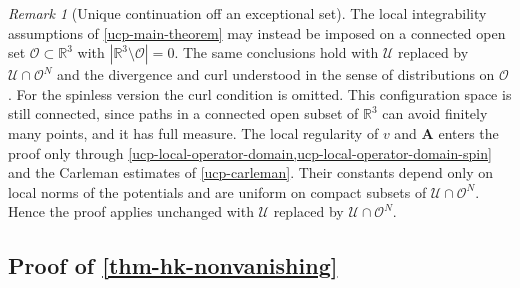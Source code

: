 \documentclass[final,reqno]{amsart}
\theoremstyle{remark}
\newtheorem{remark}{Remark}
\newcommand{\RR}{\mathbb{R}}
\newcommand{\vA}{{\mathbf{A}}}
\begin{document}
\begin{remark}[Unique continuation off an exceptional set]
\label{rem-ucp-domain-extension}
The local integrability assumptions of \cref{ucp-main-theorem} may
instead be imposed on a connected open set $\mathcal O\subset\RR^3$
with $|\RR^3\setminus\mathcal O|=0$.  The same conclusions hold with
$\mathcal U$ replaced by $\mathcal U\cap\mathcal O^N$ and the
divergence and curl understood in the sense of distributions on $\mathcal O$.
For the spinless version the curl condition is omitted.
This configuration space is still connected, since paths in a
connected open subset of $\RR^3$ can avoid finitely many points,
and it has full measure.  The local regularity of $v$ and $\vA$ enters
the proof only through
\cref{ucp-local-operator-domain,ucp-local-operator-domain-spin} and the
Carleman estimates of \cref{ucp-carleman}.  Their constants depend only
on local norms of the potentials and are uniform on compact subsets of
$\mathcal U\cap\mathcal O^N$.  Hence the proof applies unchanged with
$\mathcal U$ replaced by $\mathcal U\cap\mathcal O^N$.
\end{remark}

\subsection{Proof of \texorpdfstring{\cref{thm-hk-nonvanishing}}{Theorem }}
\end{document}
